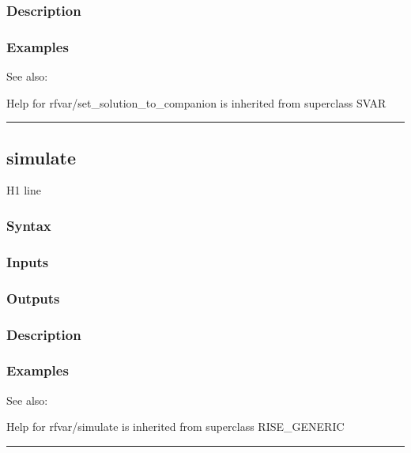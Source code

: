 \documentclass[letterpaper,10pt,english]{sphinxmanual}
\begin{document}
\subsubsection{Description}
\label{classes/models/@rfvar/rfvar:id119}

\subsubsection{Examples}
\label{classes/models/@rfvar/rfvar:id120}
See also:

Help for rfvar/set\_solution\_to\_companion is inherited from superclass SVAR


\bigskip\hrule{}\bigskip



\subsection{simulate}
\label{classes/models/@rfvar/rfvar:id121}\label{classes/models/@rfvar/rfvar:simulate}
H1 line


\subsubsection{Syntax}
\label{classes/models/@rfvar/rfvar:id122}

\subsubsection{Inputs}
\label{classes/models/@rfvar/rfvar:id123}

\subsubsection{Outputs}
\label{classes/models/@rfvar/rfvar:id124}

\subsubsection{Description}
\label{classes/models/@rfvar/rfvar:id125}

\subsubsection{Examples}
\label{classes/models/@rfvar/rfvar:id126}
See also:

Help for rfvar/simulate is inherited from superclass RISE\_GENERIC


\bigskip\hrule{}\bigskip
\end{document}

